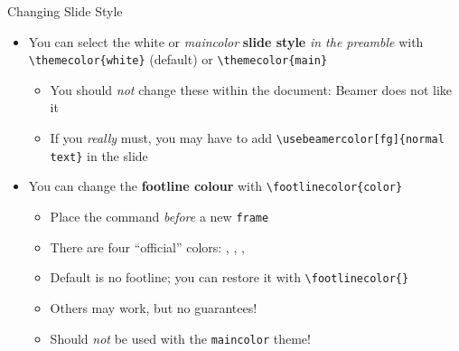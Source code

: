 \begin{frame}[fragile]{Changing Slide Style}
	\begin{itemize}
		\item You can select the white or \textit{maincolor} \textbf{slide style} \emph{in the
			      preamble} with \verb|\themecolor{white}| (default) or \verb|\themecolor{main}|
		      \begin{itemize}
			      \item You should \emph{not} change these within the document: Beamer does
			            not like it
			      \item If you \emph{really} must, you may have to add
			            \verb|\usebeamercolor[fg]{normal text}| in the slide
		      \end{itemize}
		\item You can change the \textbf{footline colour} with
		      \verb|\footlinecolor{color}|
		      \begin{itemize}
			      \item Place the command \emph{before} a new \verb|frame|
			      \item There are four ``official'' colors:
			            , ,
			            , 
			      \item Default is no footline; you can restore it with
			            \verb|\footlinecolor{}|
			      \item Others may work, but no guarantees!
			      \item Should \emph{not} be used with the \verb|maincolor| theme!
		      \end{itemize}
	\end{itemize}
\end{frame}